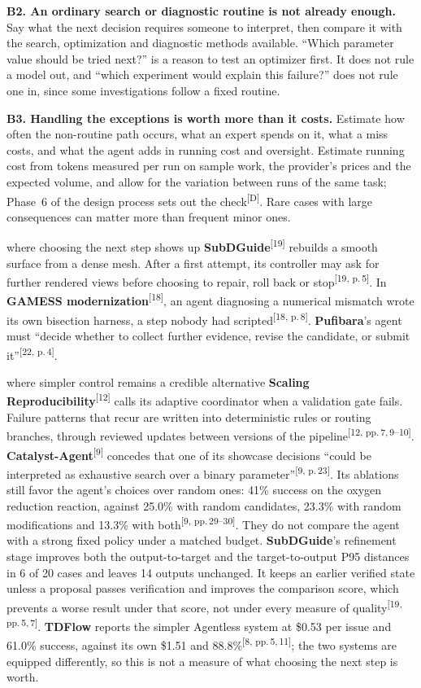 \documentclass[10pt]{article}
\newcommand{\p}[1]{\textsuperscript{[#1]}}
\begin{document}
\textbf{B2. An ordinary search or diagnostic routine is not already enough.}
Say what the next decision requires someone to interpret, then compare it with the search, optimization and diagnostic methods available.
``Which parameter value should be tried next?'' is a reason to test an optimizer first. It does not rule a model out, and ``which experiment would explain this failure?'' does not rule one in, since some investigations follow a fixed routine.

\textbf{B3. Handling the exceptions is worth more than it costs.}
Estimate how often the non-routine path occurs, what an expert spends on it, what a miss costs, and what the agent adds in running cost and oversight.
Estimate running cost from tokens measured per run on sample work, the provider's prices and the expected volume, and allow for the variation between runs of the same task; Phase~6 of the design process sets out the check\p{D}.
Rare cases with large consequences can matter more than frequent minor ones.

\begin{example}{where choosing the next step shows up}
\textbf{SubDGuide}\p{19} rebuilds a smooth surface from a dense mesh. After a first attempt, its controller may ask for further rendered views before choosing to repair, roll back or stop\p{19, p.\,5}. In \textbf{GAMESS modernization}\p{18}, an agent diagnosing a numerical mismatch wrote its own bisection harness, a step nobody had scripted\p{18, p.\,8}. \textbf{Pufibara}'s agent must ``decide whether to collect further evidence, revise the candidate, or submit it''\p{22, p.\,4}.
\end{example}

\begin{example}{where simpler control remains a credible alternative}
\textbf{Scaling Reproducibility}\p{12} calls its adaptive coordinator when a validation gate fails. Failure patterns that recur are written into deterministic rules or routing branches, through reviewed updates between versions of the pipeline\p{12, pp.\,7,\,9--10}. \textbf{Catalyst-Agent}\p{9} concedes that one of its showcase decisions ``could be interpreted as exhaustive search over a binary parameter''\p{9, p.\,23}. Its ablations still favor the agent's choices over random ones: 41\% success on the oxygen reduction reaction, against 25.0\% with random candidates, 23.3\% with random modifications and 13.3\% with both\p{9, pp.\,29--30}. They do not compare the agent with a strong fixed policy under a matched budget. \textbf{SubDGuide}'s refinement stage improves both the output-to-target and the target-to-output P95 distances in 6 of 20 cases and leaves 14 outputs unchanged. It keeps an earlier verified state unless a proposal passes verification and improves the comparison score, which prevents a worse result under that score, not under every measure of quality\p{19, pp.\,5,\,7}. \textbf{TDFlow} reports the simpler Agentless system at \$0.53 per issue and 61.0\% success, against its own \$1.51 and 88.8\%\p{8, pp.\,5,\,11}; the two systems are equipped differently, so this is not a measure of what choosing the next step is worth.
\end{example}
\end{document}
